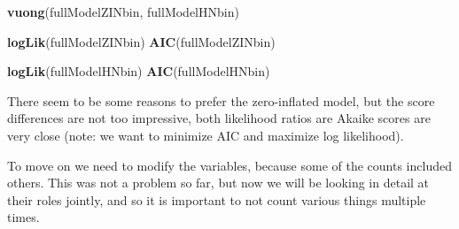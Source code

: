 \documentclass[10pt,]{scrartcl}
\newenvironment{Shaded}{\begin{snugshade}}{\end{snugshade}}
\newcommand{\KeywordTok}[1]{\textcolor[rgb]{0.13,0.29,0.53}{\textbf{#1}}}
\newcommand{\StringTok}[1]{\textcolor[rgb]{0.31,0.60,0.02}{#1}}
\newcommand{\CommentTok}[1]{\textcolor[rgb]{0.56,0.35,0.01}{\textit{#1}}}
\newcommand{\OperatorTok}[1]{\textcolor[rgb]{0.81,0.36,0.00}{\textbf{#1}}}
\newcommand{\NormalTok}[1]{#1}
\begin{document}
\footnotesize

\begin{Shaded}
\begin{Highlighting}[]
\KeywordTok{vuong}\NormalTok{(fullModelZINbin, fullModelHNbin)}
\end{Highlighting}
\end{Shaded}

\begin{Shaded}
\begin{Highlighting}[]
\KeywordTok{logLik}\NormalTok{(fullModelZINbin)}
\KeywordTok{AIC}\NormalTok{(fullModelZINbin)}

\KeywordTok{logLik}\NormalTok{(fullModelHNbin)}
\KeywordTok{AIC}\NormalTok{(fullModelHNbin)}
\end{Highlighting}
\end{Shaded}

\normalsize

There seem to be some reasons to prefer the zero-inflated model, but the
score differences are not too impressive, both likelihood ratios are
Akaike scores are very close (note: we want to minimize AIC and maximize
log likelihood).

To move on we need to modify the variables, because some of the counts
included others. This was not a problem so far, but now we will be
looking in detail at their roles jointly, and so it is important to not
count various things multiple times.

\footnotesize

\begin{Shaded}
\end{Shaded}
\end{document}
